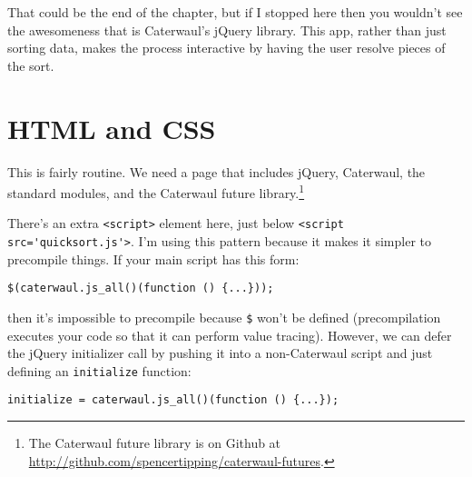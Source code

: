 \documentclass{report}
\begin{document}
  That could be the end of the chapter, but if I stopped here then you wouldn't see the awesomeness that is Caterwaul's jQuery library. This app, rather than just sorting data, makes the
  process interactive by having the user resolve pieces of the sort.

\section{HTML and CSS}
    This is fairly routine. We need a page that includes jQuery, Caterwaul, the standard modules, and the Caterwaul future library.\footnote{The Caterwaul future library is on Github at
    \url{http://github.com/spencertipping/caterwaul-futures}.}

    There's an extra \verb|<script>| element here, just below \verb|<script src='quicksort.js'>|. I'm using this pattern because it makes it simpler to precompile things. If your main script
    has this form:

\begin{verbatim}
$(caterwaul.js_all()(function () {...}));
\end{verbatim}

    \noindent then it's impossible to precompile because \verb|$| won't be defined (precompilation executes your code so that it can perform value tracing). However, we can defer the jQuery
    initializer call by pushing it into a non-Caterwaul script and just defining an {\tt initialize} function:

\begin{verbatim}
initialize = caterwaul.js_all()(function () {...});
\end{verbatim}

\end{document}
